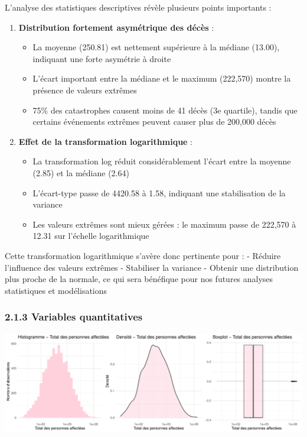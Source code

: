 \documentclass[
]{article}
\providecommand{\tightlist}{%
  \setlength{\itemsep}{0pt}\setlength{\parskip}{0pt}}
\begin{document}
L'analyse des statistiques descriptives révèle plusieurs points
importants :

\begin{enumerate}
\def\labelenumi{\arabic{enumi}.}
\tightlist
\item
  \textbf{Distribution fortement asymétrique des décès} :

  \begin{itemize}
  \tightlist
  \item
    La moyenne (250.81) est nettement supérieure à la médiane (13.00),
    indiquant une forte asymétrie à droite
  \item
    L'écart important entre la médiane et le maximum (222,570) montre la
    présence de valeurs extrêmes
  \item
    75\% des catastrophes causent moins de 41 décès (3e quartile),
    tandis que certains événements extrêmes peuvent causer plus de
    200,000 décès
  \end{itemize}
\item
  \textbf{Effet de la transformation logarithmique} :

  \begin{itemize}
  \tightlist
  \item
    La transformation log réduit considérablement l'écart entre la
    moyenne (2.85) et la médiane (2.64)
  \item
    L'écart-type passe de 4420.58 à 1.58, indiquant une stabilisation de
    la variance
  \item
    Les valeurs extrêmes sont mieux gérées : le maximum passe de 222,570
    à 12.31 sur l'échelle logarithmique
  \end{itemize}
\end{enumerate}

Cette transformation logarithmique s'avère donc pertinente pour : -
Réduire l'influence des valeurs extrêmes - Stabiliser la variance -
Obtenir une distribution plus proche de la normale, ce qui sera
bénéfique pour nos futures analyses statistiques et modélisations

\subsubsection{2.1.3 Variables
quantitatives}\label{variables-quantitatives}

\includegraphics{Projet_ML_files/figure-latex/quantitative_vars-1.pdf}
\end{document}
